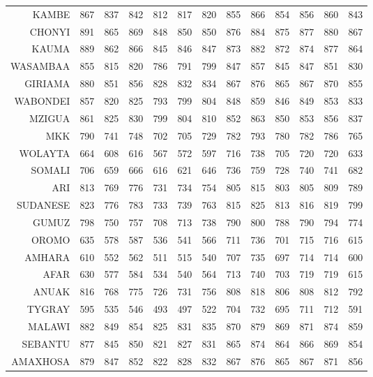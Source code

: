 \begin{longtable}{rrrrrrrrrrrrr}
  KAMBE & 867 & 837 & 842 & 812 & 817 & 820 & 855 & 866 & 854 & 856 & 860 & 843 \\ 
  CHONYI & 891 & 865 & 869 & 848 & 850 & 850 & 876 & 884 & 875 & 877 & 880 & 867 \\ 
  KAUMA & 889 & 862 & 866 & 845 & 846 & 847 & 873 & 882 & 872 & 874 & 877 & 864 \\ 
  WASAMBAA & 855 & 815 & 820 & 786 & 791 & 799 & 847 & 857 & 845 & 847 & 851 & 830 \\ 
  GIRIAMA & 880 & 851 & 856 & 828 & 832 & 834 & 867 & 876 & 865 & 867 & 870 & 855 \\ 
  WABONDEI & 857 & 820 & 825 & 793 & 799 & 804 & 848 & 859 & 846 & 849 & 853 & 833 \\ 
  MZIGUA & 861 & 825 & 830 & 799 & 804 & 810 & 852 & 863 & 850 & 853 & 856 & 837 \\ 
   \hline 
MKK & 790 & 741 & 748 & 702 & 705 & 729 & 782 & 793 & 780 & 782 & 786 & 765 \\ 
  WOLAYTA & 664 & 608 & 616 & 567 & 572 & 597 & 716 & 738 & 705 & 720 & 720 & 633 \\ 
  SOMALI & 706 & 659 & 666 & 616 & 621 & 646 & 736 & 759 & 728 & 740 & 741 & 682 \\ 
  ARI & 813 & 769 & 776 & 731 & 734 & 754 & 805 & 815 & 803 & 805 & 809 & 789 \\ 
  SUDANESE & 823 & 776 & 783 & 733 & 739 & 763 & 815 & 825 & 813 & 816 & 819 & 799 \\ 
  GUMUZ & 798 & 750 & 757 & 708 & 713 & 738 & 790 & 800 & 788 & 790 & 794 & 774 \\ 
  OROMO & 635 & 578 & 587 & 536 & 541 & 566 & 711 & 736 & 701 & 715 & 716 & 615 \\ 
  AMHARA & 610 & 552 & 562 & 511 & 515 & 540 & 707 & 735 & 697 & 714 & 714 & 600 \\ 
  AFAR & 630 & 577 & 584 & 534 & 540 & 564 & 713 & 740 & 703 & 719 & 719 & 615 \\ 
  ANUAK & 816 & 768 & 775 & 726 & 731 & 756 & 808 & 818 & 806 & 808 & 812 & 792 \\ 
  TYGRAY & 595 & 535 & 546 & 493 & 497 & 522 & 704 & 732 & 695 & 711 & 712 & 591 \\ 
   \hline 
MALAWI & 882 & 849 & 854 & 825 & 831 & 835 & 870 & 879 & 869 & 871 & 874 & 859 \\ 
  SEBANTU & 877 & 845 & 850 & 821 & 827 & 831 & 865 & 874 & 864 & 866 & 869 & 854 \\ 
  AMAXHOSA & 879 & 847 & 852 & 822 & 828 & 832 & 867 & 876 & 865 & 867 & 871 & 856 \\ 

\end{longtable}
